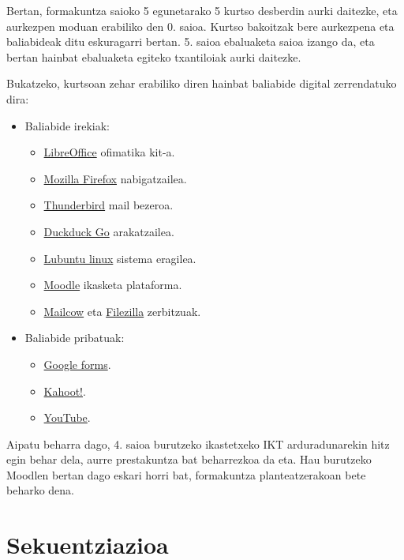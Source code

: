 Bertan, formakuntza saioko 5 egunetarako 5 kurtso desberdin aurki daitezke, eta aurkezpen moduan erabiliko den 0. saioa. Kurtso bakoitzak bere aurkezpena eta baliabideak ditu eskuragarri bertan. 5. saioa ebaluaketa saioa izango da, eta bertan hainbat ebaluaketa egiteko txantiloiak aurki daitezke.

Bukatzeko, kurtsoan zehar erabiliko diren hainbat baliabide digital zerrendatuko dira:

\begin{itemize}
    \item Baliabide irekiak:
    \begin{itemize}
        \item \href{https://es.libreoffice.org/}{LibreOffice} ofimatika kit-a.
        \item \href{https://www.mozilla.org/eu/firefox/}{Mozilla Firefox} nabigatzailea.
        \item \href{https://www.thunderbird.net/eu/}{Thunderbird} mail bezeroa.
        \item \href{https://duckduckgo.com/?kat=-1&kah=wt-wt&kad=eu_ES}{Duckduck Go} arakatzailea.
        \item \href{https://lubuntu.me/}{Lubuntu linux} sistema eragilea.
        \item \href{https://moodle.com/es/}{Moodle} ikasketa plataforma.
        \item \href{https://mailcow.email/}{Mailcow} eta \href{https://filezilla-project.org/}{Filezilla} zerbitzuak.
    \end{itemize}
    \item Baliabide pribatuak:
    \begin{itemize}
        \item \href{https://docs.google.com/forms/}{Google forms}.
        \item \href{https://kahoot.it/}{Kahoot!}.
        \item \href{https://youtube.com/}{YouTube}.
    \end{itemize}
\end{itemize}

Aipatu beharra dago, 4. saioa burutzeko ikastetxeko IKT arduradunarekin hitz egin behar dela, aurre prestakuntza bat beharrezkoa da eta. Hau burutzeko Moodlen bertan dago eskari horri bat, formakuntza planteatzerakoan bete beharko dena.

\section{Sekuentziazioa}
\label{tab:sekuentziazio}

